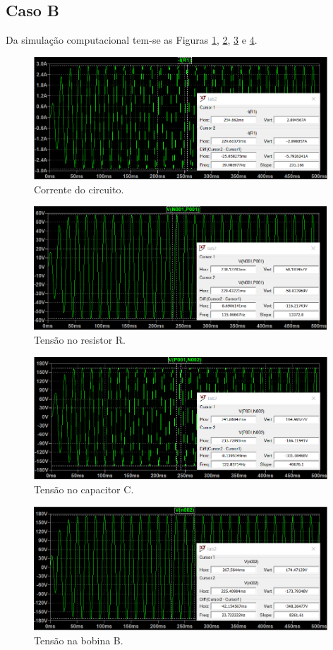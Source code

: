 \documentclass[a4paper,12pt,oneside,openany,table,xcdraw]{article}
\begin{document}
\subsection{Caso B}
Da simulação computacional tem-se as Figuras \ref{corrente2}, \ref{tensao-R2}, \ref{tensao-C2} e \ref{tensao-B2}.
\begin{figure}[H]
\centering
\captionsetup{font=scriptsize}
\includegraphics[width=11cm]{corrente2}
\caption{Corrente do circuito.}
\label{corrente2}
\end{figure}
\begin{figure}[H]
\centering
\captionsetup{font=scriptsize}
\includegraphics[width=11cm]{tensao-R2}
\caption{Tensão no resistor R.}
\label{tensao-R2}
\end{figure}
\begin{figure}[H]
\centering
\captionsetup{font=scriptsize}
\includegraphics[width=11cm]{tensao-C2}
\caption{Tensão no capacitor C.}
\label{tensao-C2}
\end{figure}
\begin{figure}[H]
\centering
\captionsetup{font=scriptsize}
\includegraphics[width=11cm]{tensao-B2}
\caption{Tensão na bobina B.}
\label{tensao-B2}
\end{figure}
\end{document}
